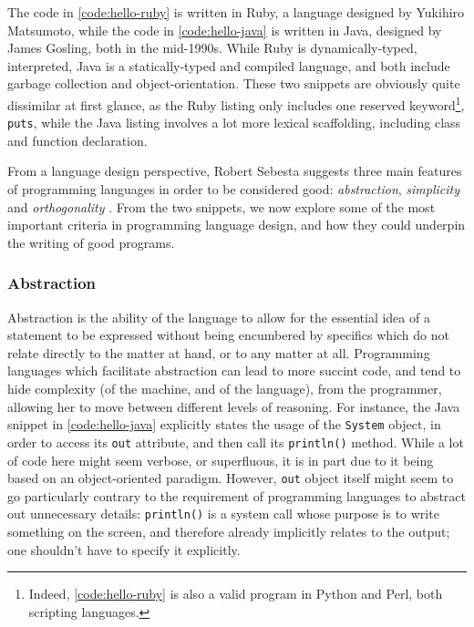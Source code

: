 The code in \ref{code:hello-ruby} is written in Ruby, a language designed by Yukihiro Matsumoto, while the code in \ref{code:hello-java} is written in Java, designed by James Gosling, both in the mid-1990s. While Ruby is dynamically-typed, interpreted, Java is a statically-typed and compiled language, and both include garbage collection and object-orientation. These two snippets are obviously quite dissimilar at first glance, as the Ruby listing only includes one reserved keyword\footnote{Indeed, \ref{code:hello-ruby} is also a valid program in Python and Perl, both scripting languages.}, \lstinline{puts}, while the Java listing involves a lot more lexical scaffolding, including class and function declaration.

From a language design perspective, Robert Sebesta suggests three main features of programming languages in order to be considered good: \emph{abstraction}, \emph{simplicity} and \emph{orthogonality} \citep{sebesta_concepts_2018}. From the two snippets, we now explore some of the most important criteria in programming language design, and how they could underpin the writing of good programs.

\subsubsection{Abstraction}
\label{subsubsec:programming-abstraction}

Abstraction is the ability of the language to allow for the essential idea of a statement to be expressed without being encumbered by specifics which do not relate directly to the matter at hand, or to any matter at all. Programming languages which facilitate abstraction can lead to more succint code, and tend to hide complexity (of the machine, and of the language), from the programmer, allowing her to move between different levels of reasoning. For instance, the Java snippet in \ref{code:hello-java} explicitly states the usage of the \lstinline{System} object, in order to access its \lstinline{out} attribute, and then call its \lstinline{println()} method. While a lot of code here might seem verbose, or superfluous, it is in part due to it being based on an object-oriented paradigm. However, \lstinline{out} object itself might seem to go particularly contrary to the requirement of programming languages to abstract out unnecessary details: \lstinline{println()} is a system call whose purpose is to write something on the screen, and therefore already implicitly relates to the output; one shouldn't have to specify it explicitly.

